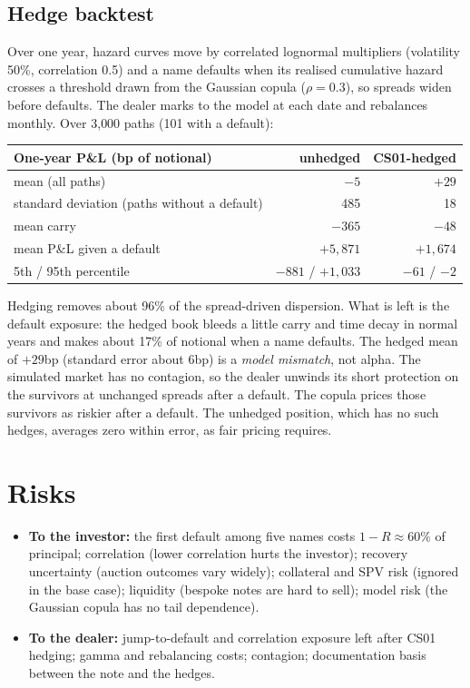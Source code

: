 \documentclass[11pt,a4paper]{article}
\begin{document}
\subsection{Hedge backtest}
Over one year, hazard curves move by correlated lognormal multipliers (volatility 50\%, correlation
0.5) and a name defaults when its realised cumulative hazard crosses a threshold drawn from the
Gaussian copula ($\rho=0.3$), so spreads widen before defaults. The dealer marks to the model at each
date and rebalances monthly. Over 3{,}000 paths (101 with a default):
\begin{center}\small
\begin{tabular}{lrr}\toprule
One-year P\&L (bp of notional) & unhedged & CS01-hedged\\\midrule
mean (all paths) & $-5$ & $+29$\\
standard deviation (paths without a default) & 485 & 18\\
mean carry & $-365$ & $-48$\\
mean P\&L given a default & $+5{,}871$ & $+1{,}674$\\
5th / 95th percentile & $-881$ / $+1{,}033$ & $-61$ / $-2$\\\bottomrule
\end{tabular}
\end{center}
Hedging removes about 96\% of the spread-driven dispersion. What is left is the default exposure: the
hedged book bleeds a little carry and time decay in normal years and makes about 17\% of notional when a
name defaults. The hedged mean of $+29$bp (standard error about 6bp) is a \emph{model mismatch}, not
alpha. The simulated market has no contagion, so the dealer unwinds its short protection on the survivors
at unchanged spreads after a default. The copula prices those survivors as riskier after a default. The
unhedged position, which has no such hedges, averages zero within error, as fair pricing requires.

\section{Risks}
\begin{itemize}[nosep]
\item \textbf{To the investor:} the first default among five names costs $1-R\approx60\%$ of principal;
correlation (lower correlation hurts the investor); recovery uncertainty (auction outcomes vary widely);
collateral and SPV risk (ignored in the base case); liquidity (bespoke notes are hard to sell); model risk
(the Gaussian copula has no tail dependence).
\item \textbf{To the dealer:} jump-to-default and correlation exposure left after CS01 hedging; gamma and
rebalancing costs; contagion; documentation basis between the note and the hedges.
\end{itemize}
\end{document}

